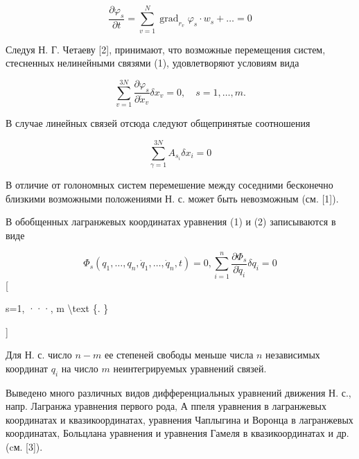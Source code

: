 \documentclass[10pt]{article}
\begin{document}
\[

\frac{\partial \varphi_{s}}{\partial t}=\sum_{v=1}^{N} \operatorname{grad}_{r_{v}} \varphi_{s} \cdot w_{s}+\ldots=0

\]



Следуя Н. Г. Четаеву [2], принимают, что возможные перемещения систем, стесненных нелинейными связями (1), удовлетворяют условиям вида



\[

\sum_{v=1}^{3 N} \frac{\partial \varphi_{s}}{\partial \dot{x}_{v}} \delta x_{v}=0, \quad s=1, \ldots, m .

\]



В случае линейных связей отсюда следуют общепринятые соотношения



\[

\sum_{\gamma=1}^{3 N} A_{s_{i}} \delta x_{i}=0

\]



В отличие от голономных систем перемешение между соседними бесконечно близкими возможными положениями Н. с. может быть невозможным (см. [1]).



В обобщенных лагранжевых координатах уравнения (1) и (2) записываются в виде



\[

\Phi_{s}\left(q_{1}, \ldots, q_{n}, \dot{q}_{1}, \ldots, \dot{q}_{n}, t\right)=0, \sum_{i=1}^{n} \frac{\partial \Phi_{s}}{\partial \dot{q}_{i}} \delta q_{i}=0

\][



s=1, ···, m \textbackslash text \{. \}

]



Для Н. с. число $n-m$ ее степеней свободы меньше числа $n$ независимых координат $q_{i}$ на число $m$ неинтегрируемых уравнений связей.



Выведено много различных видов дифференциальных уравнений движения Н. с., напр. Лагранжа уравнения первого рода, А ппеля уравнения в лагранжевых координатах и квазикоординатах, уравнения Чаплыгина и Воронца в лагранжевых координатах, Больцлана уравнения и уравнения Гамеля в квазикоординатах и др. (cм. [3]).
\end{document}
